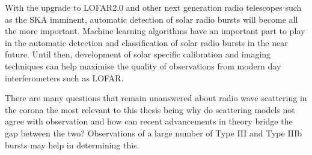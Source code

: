 With the upgrade to LOFAR2.0 and other next generation radio telescopes such as the SKA imminent, automatic detection of solar radio bursts will become all the more important. Machine learning algorithms have an important part to play in the automatic detection and classification of solar radio bursts in the near future. Until then, development of solar specific calibration and imaging techniques can help maximise the quality of observations from modern day interferometers such as LOFAR.  

There are many questions that remain unanswered about radio wave scattering in the corona the most relevant to this thesis being why do scattering models not agree with observation and how can recent advancements in theory bridge the gap between the two? Observations of a large number of Type III and Type IIIb bursts may help in determining this. 















